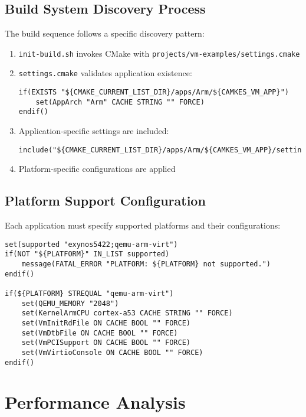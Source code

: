 \documentclass[12pt,a4paper]{article}
\begin{document}
\subsection{Build System Discovery Process}

The build sequence follows a specific discovery pattern:

\begin{enumerate}
\item \texttt{init-build.sh} invokes CMake with \texttt{projects/vm-examples/settings.cmake}
\item \texttt{settings.cmake} validates application existence:
\begin{lstlisting}[style=camkes]
if(EXISTS "${CMAKE_CURRENT_LIST_DIR}/apps/Arm/${CAMKES_VM_APP}")
    set(AppArch "Arm" CACHE STRING "" FORCE)
endif()
\end{lstlisting}
\item Application-specific settings are included:
\begin{lstlisting}[style=camkes]
include("${CMAKE_CURRENT_LIST_DIR}/apps/Arm/${CAMKES_VM_APP}/settings.cmake")
\end{lstlisting}
\item Platform-specific configurations are applied
\end{enumerate}

\subsection{Platform Support Configuration}

Each application must specify supported platforms and their configurations:

\begin{lstlisting}[style=camkes, caption=Platform support in settings.cmake]
set(supported "exynos5422;qemu-arm-virt")
if(NOT "${PLATFORM}" IN_LIST supported)
    message(FATAL_ERROR "PLATFORM: ${PLATFORM} not supported.")
endif()

if(${PLATFORM} STREQUAL "qemu-arm-virt")
    set(QEMU_MEMORY "2048")
    set(KernelArmCPU cortex-a53 CACHE STRING "" FORCE)
    set(VmInitRdFile ON CACHE BOOL "" FORCE)
    set(VmDtbFile ON CACHE BOOL "" FORCE)
    set(VmPCISupport ON CACHE BOOL "" FORCE)
    set(VmVirtioConsole ON CACHE BOOL "" FORCE)
endif()
\end{lstlisting}

\section{Performance Analysis}
\end{document}
